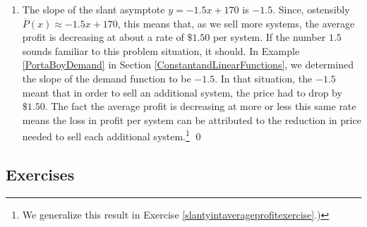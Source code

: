 \begin{ex}
\begin{enumerate}
\item The slope of the slant asymptote $y = -1.5x+170$ is $-1.5$.  Since, ostensibly $\overline{P}(x) \approx -1.5 x + 170$, this means that, as we sell more systems, the average profit is decreasing at about a rate of $\$ 1.50$ per system.  If the number $1.5$ sounds familiar to this problem situation, it should.  In Example \ref{PortaBoyDemand} in Section \ref{ConstantandLinearFunctions}, we determined the slope of the demand function to be $-1.5$. In that situation, the $-1.5$ meant that in order to sell an additional system, the price had to drop by $\$ 1.50$.  The fact the average profit is decreasing at more or less this same rate means the loss in profit per system can be attributed to the reduction in price needed to sell each additional system.\footnote{We generalize this result in Exercise \ref{slantyintaverageprofitexercise}.)} \qed

\end{enumerate}

\end{ex}

\clearpage

\subsection{Exercises}



\closegraphsfile